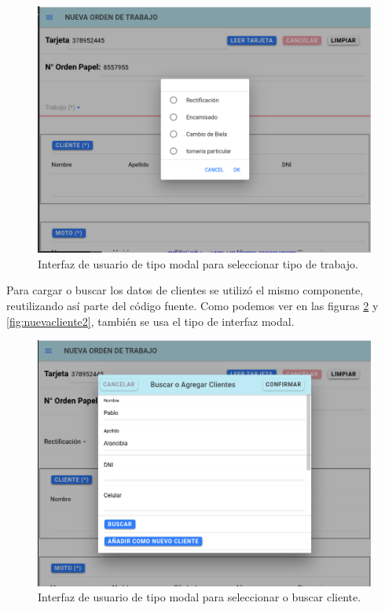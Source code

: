 \begin{figure}[H]
	\centering
	\includegraphics[scale=.30]{./Figures/nueva-trabajo.png}
	\caption{Interfaz de usuario de tipo modal para seleccionar tipo de trabajo.}
	\label{fig:nuevatrabajo}
\end{figure}

Para cargar o buscar los datos de clientes se utilizó el mismo componente, reutilizando así parte del código fuente. Como podemos ver en las figuras \ref{fig:nuevacliente1} y \ref{fig:nuevacliente2}, también se usa el tipo de interfaz modal.

\begin{figure}[H]
	\centering
	\includegraphics[scale=.30]{./Figures/nueva-clientes-1.png}
	\caption{Interfaz de usuario de tipo modal para seleccionar o buscar cliente.}
	\label{fig:nuevacliente1}
\end{figure}

